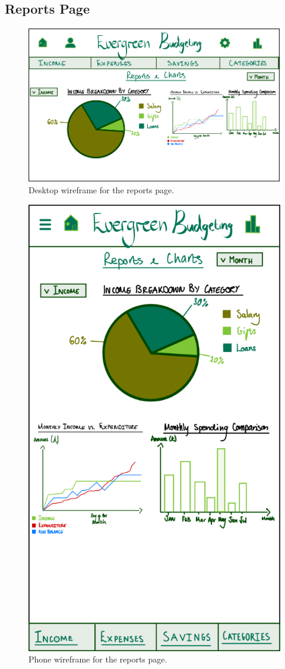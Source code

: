 \documentclass{l4proj}
\begin{document}
\begin{appendices}
\section{Reports Page}
\begin{figure}[htb]
    \centering
    \includegraphics[width=0.75\linewidth]{images/Wireframes/wireframe-reports-desktop.png}
    \caption{Desktop wireframe for the reports page.}
    \label{fig:enter-label}
\end{figure}

\begin{figure}[htb]
    \centering
    \includegraphics[width=0.3\linewidth]{images/Wireframes/wireframe-reports-phone.png}
    \caption{Phone wireframe for the reports page.}
    \label{fig:enter-label}
\end{figure}
\newpage


\end{appendices}
\end{document}
